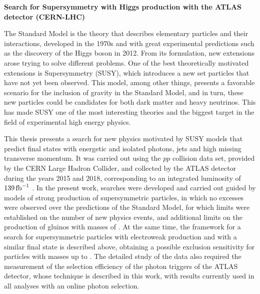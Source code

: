\thispagestyle{empty}

{\centering \bf \Large  Search for Supersymmetry with Higgs production with the ATLAS detector (CERN-LHC)\\}

\vspace{2cm}

The Standard Model is the theory that describes elementary particles and their interactions, developed in the 1970s and with great experimental predictions such as the discovery of the Higgs boson in 2012. From its formulation, new extensions arose trying to solve different problems. One of the best theoretically motivated extensions is Supersymmetry (SUSY), which introduces a new set particles that have not yet been observed. This model, among other things, presents a favorable scenario for the inclusion of gravity in the Standard Model, and in turn, these new particles could be candidates for both dark matter and heavy neutrinos. This has made SUSY one of the most interesting theories and the biggest target in the field of experimental high energy physics.

This thesis presents a search for new physics motivated by SUSY models that predict final states with energetic and isolated photons, jets and high missing transverse momentum. It was carried out using the $pp$ collision data set, provided by the CERN Large Hadron Collider, and collected by the ATLAS detector during the years 2015 and 2018, corresponding to an integrated luminosity of $139\,\text{fb}^{-1}$ . In the present work, searches were developed and carried out guided by models of strong production of supersymmetric particles, in which no excesses were observed over the predictions of the Standard Model, for which limits were established on the number of new physics events, and additional limits on the production of gluinos with masses of . At the same time, the framework for a search for supersymmetric particles with electroweak production and with a similar final state is described above, obtaining a possible exclusion sensitivity for particles with masses up to . The detailed study of the data also required the measurement of the selection efficiency of the photon triggers of the ATLAS detector, whose technique is described in this work, with results currently used in all analyses with an online photon selection.



